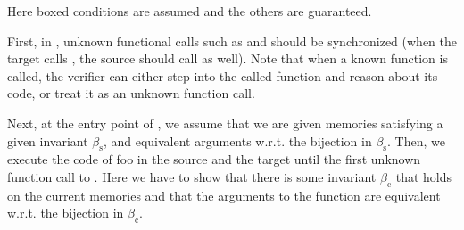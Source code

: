 \noindent Here boxed conditions are assumed and the others are guaranteed.

First, in , unknown functional calls such as
 and  should be synchronized (\ie when
the target calls , the source should call  as
well). Note that when a known function is called, the verifier can either step into
the called function and reason about its code, or treat
it as an unknown function call.

Next, at the entry point of , we assume that we are given
memories satisfying a given invariant $\beta_\textrm{s}$, and
equivalent arguments w.r.t. the bijection in $\beta_\textrm{s}$.
Then, we execute the code of \textrm{foo} in the source and the target
until the first unknown function call to .  Here we have
to show that there is some invariant $\beta_\textrm{c}$ that holds on
the current memories and that the arguments to the function 
are equivalent w.r.t. the bijection in $\beta_\textrm{c}$.

